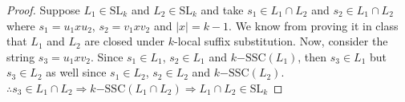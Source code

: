 \documentclass[10pt]{article}
\newenvironment{AnswerBox}{\begin{mdframed}[style=simple]}{\end{mdframed}}
\begin{document}
\begin{AnswerBox}%

\begin{proof}
    Suppose $L_1 \in \mathrm{SL}_k$ and $L_2 \in \mathrm{SL}_k$ and take $s_1 \in L_1\cap L_2$ and $s_2\in L_1\cap L_2$ where $s_1=u_1xu_2$, $s_2=v_1xv_2$ and $|x|=k-1$. We know from proving it in class that $L_1$ and $L_2$ are closed under $k$-local suffix substitution. Now, consider the string $s_3=u_1xv_2$. Since $s_1\in L_1$, $s_2\in L_1$ and $k\mathrm{-SSC}(L_1)$, then $s_3\in L_1$ but $s_3\in L_2$ as well since $s_1\in L_2$, $s_2\in L_2$ and $k\mathrm{-SSC}(L_2)$.\\
    $\therefore s_3\in L_1\cap L_2 \Rightarrow k\mathrm{-SSC}(L_1\cap L_2) \Rightarrow L_1\cap L_2\in \mathrm{SL}_k$ 
\end{proof}
    
\end{AnswerBox}%
\end{document}
